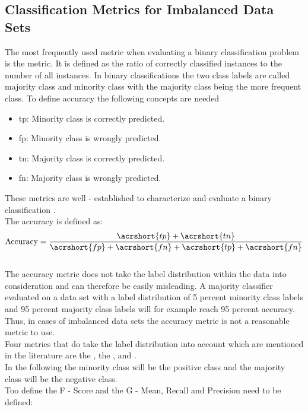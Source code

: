 \subsection{Classification Metrics for Imbalanced Data Sets}
\label{sec:metrics}
The most frequently used metric when evaluating a binary classification problem is the  metric. It is defined as the ratio of correctly classified instances to the number of all instances. In binary classifications the two class labels are called majority class and minority class with the majority class being the more frequent class. To define accuracy the following concepts are needed
\begin{itemize}
    \item \acrfull{tp}: Minority class is correctly predicted.
    \item \acrfull{fp}: Minority class is wrongly predicted.
    \item \acrfull{tn}: Majority class is correctly predicted.
    \item \acrfull{fn}: Majority class is wrongly predicted.
\end{itemize}
These metrics are well - established to characterize and evaluate a binary classification \cite{tharwat2020classification}. \\
The accuracy is defined as:
\begin{equation}
    \text{Accuracy} = \frac{\acrshort{tp} + \acrshort{tn}}{\acrshort{fp} + \acrshort{fn} + \acrshort{tp} + \acrshort{fn}}
\end{equation}\\
The accuracy metric does not take the label distribution within the data into consideration and can therefore be easily misleading. A majority classifier evaluated on a data set with a label distribution of 5 percent minority class labels and 95 percent majority class labels will for example reach 95 percent accuracy.\\
Thus, in cases of imbalanced data sets the accuracy metric is not a reasonable metric to use.\\
Four metrics that do take the label distribution into account which are mentioned in the literature are the , the ,  and  \cite{he2009learning}.\\
In the following the minority class will be the positive class and the majority class will be the negative class.\\ 
Too define the F - Score and the G - Mean, Recall and Precision need to be defined:\\

